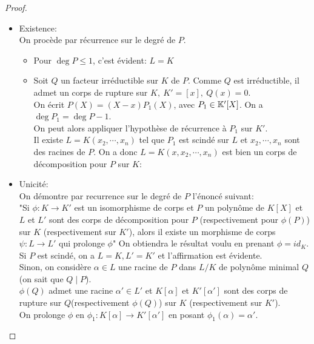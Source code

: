 \begin{proof}
	\begin{itemize}
		\item Existence:\\
		      On procède par récurrence sur le degré de $P$.
		      \begin{itemize}
			      \item Pour $\deg P \leq 1$, c'est évident: $L = K$
			      \item Soit $Q$ un facteur irréductible sur $K$ de $P$.
			            Comme $Q$ est irréductible, il admet un corps de rupture sur $K, \ K' = [x], \ Q(x) = 0$.\\
			            On écrit $P(X) = (X-x)P_1(X)$, avec $P_1 \in \mathbb{K}'[X]$. On a $\deg P_1 = \deg P -1$.\\
			            On peut alors appliquer l'hypothèse de récurrence à $P_1$ sur $K'$.\\
			            Il existe $L = K(x_2, \cdots,  x_n)$ tel que $P_1$ est scindé sur $L$ et
			            $x_2, \cdots, x_n$ sont des racines de $P$. On a donc $L = K(x, x_2, \cdots, x_n)$ est bien un
			            corps de décomposition pour $P$ sur $K$:
		      \end{itemize}
		\item Unicité:\\
		      On démontre par recurrence sur le degré de $P$ l'énoncé suivant:\\
		      "Si $\phi : K \to K'$ est un isomorphisme de corps et $P$ un polynôme de $K[X]$ et $L$ et $L'$
		      sont des corps de décomposition pour $P$ (respectivement pour $\phi(P)$) sur $K$ (respectivement sur $K'$),
		      alors il existe un morphisme de corps $\psi: L \to L'$ qui prolonge $\phi$"
		      On obtiendra le résultat voulu en prenant $\phi = id_K$.\\

		      Si $P$ est scindé, on a $L=K, L'=K'$ et l'affirmation est évidente.\\

		      Sinon, on considère $\alpha \in L$ une racine de $P$ dans $L/K$ de polynôme minimal $Q$ (on sait que $Q \mid P$).\\
		      $\phi (Q)$ admet une racine $\alpha' \in L'$ et $K[\alpha]$ et $K'[\alpha']$ sont des corps de rupture sur $Q$(respectivement $\phi(Q)$)
		      sur $K$ (respectivement sur $K'$).\\

		      On prolonge $\phi$ en $\phi_1 : K[\alpha] \to K'[\alpha']$ en posant $\phi_1(\alpha) = \alpha'$.\\


\end{itemize}
\end{proof}
